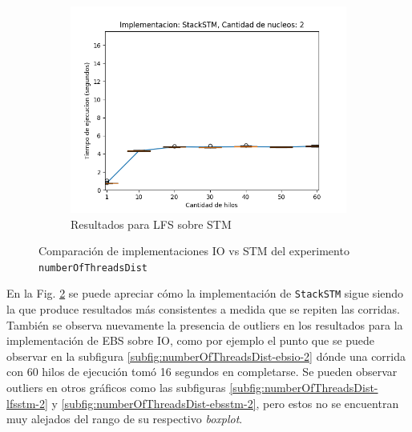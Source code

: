 \begin{figure}[!h]
\begin{subfigure}[b]{0.49\textwidth}
    \end{subfigure}
    \begin{subfigure}[b]{0.49\textwidth}
        \includegraphics[width=\textwidth]{images/numberOfThreadsDist/plots/expStackSTM-2}
        \caption{Resultados para LFS sobre STM}
        \label{subfig:numberOfThreadsDist-stackstm-2}
    \end{subfigure}
    \caption{Comparación de implementaciones IO vs STM del experimento \texttt{numberOfThreadsDist}}
    \label{fig:numberOfThreadsDist-boxplots}
\end{figure}

En la Fig. \ref{fig:numberOfThreadsDist-boxplots} se puede apreciar cómo la implementación de \texttt{StackSTM} sigue siendo la que produce resultados más consistentes a medida que se repiten las corridas.
También se observa nuevamente la presencia de outliers en los resultados para la implementación de EBS sobre IO, como por ejemplo el punto que se puede observar en la subfigura \ref{subfig:numberOfThreadsDist-ebsio-2} dónde una corrida con 60 hilos de ejecución tomó 16 segundos en completarse.
Se pueden observar outliers en otros gráficos como las subfiguras \ref{subfig:numberOfThreadsDist-lfsstm-2} y \ref{subfig:numberOfThreadsDist-ebsstm-2}, pero estos no se encuentran muy alejados del rango de su respectivo \emph{boxplot}.
